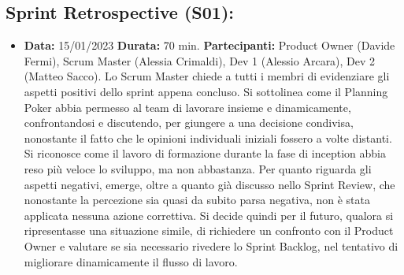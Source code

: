 \documentclass[a4paper, oneside]{article}
\newcommand\uno{Scrum Master (Alessia Crimaldi), Dev 1 (Alessio Arcara), Dev 2 (Matteo Sacco).}
\newcommand\unoP{Product Owner (Davide Fermi), }
\begin{document}
\begin{landscape}
        \newpage
        \subsection{Sprint Retrospective (S01):}
        \begin{itemize}
            \item \textbf{Data:} 15/01/2023
            \newline \textbf{Durata:} 70 min.
            \newline \textbf{Partecipanti:} \unoP \uno
            \newline
            \newline Lo Scrum Master chiede a tutti i membri di evidenziare gli aspetti positivi dello sprint appena concluso. Si sottolinea come il Planning Poker abbia permesso al team di lavorare insieme e dinamicamente, confrontandosi e discutendo, per giungere a una decisione condivisa, nonostante il fatto che le opinioni individuali iniziali fossero a volte distanti. Si riconosce come il lavoro di formazione durante la fase di inception abbia reso più veloce lo sviluppo, ma non abbastanza. Per quanto riguarda gli aspetti negativi, emerge, oltre a quanto già discusso nello Sprint Review, che nonostante la percezione sia quasi da subito parsa negativa, non è stata applicata nessuna azione correttiva. Si decide quindi per il futuro, qualora si ripresentasse una situazione simile, di richiedere un confronto con il Product Owner e valutare se sia necessario rivedere lo Sprint Backlog, nel tentativo di migliorare dinamicamente il flusso di lavoro.
        \end{itemize}

        \newpage

\end{landscape}
\end{document}
